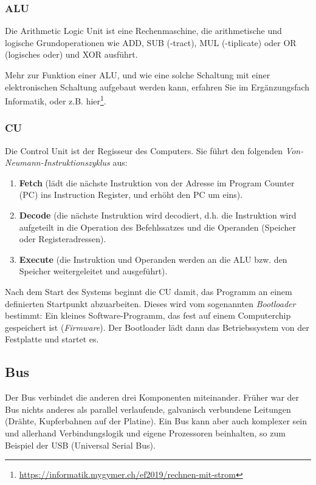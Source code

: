 \subsubsection{ALU}

Die Arithmetic Logic Unit ist eine Rechenmaschine, die arithmetische und logische Grundoperationen wie ADD, SUB (-tract), MUL (-tiplicate) oder OR (logisches oder) und XOR ausführt.

Mehr zur Funktion einer ALU, und wie eine solche Schaltung mit einer elektronischen Schaltung aufgebaut werden kann, erfahren Sie im Ergänzungsfach Informatik, oder z.B. hier\footnote{\url{https://informatik.mygymer.ch/ef2019/rechnen-mit-strom}}.

\subsubsection{CU}

Die Control Unit ist der Regisseur des Computers. Sie führt den folgenden \emph{Von-Neumann-Instruktionszyklus} aus:


\begin{enumerate}
	\item \textbf{Fetch} (lädt die nächste Instruktion von der Adresse im Program Counter (PC) ins Instruction Register, und erhöht den PC um eins).
	\item \textbf{Decode} (die nächste Instruktion wird decodiert, d.h. die Instruktion wird aufgeteilt in die Operation des Befehlssatzes und die Operanden (Speicher oder Registeradressen).
	\item \textbf{Execute} (die Instruktion und Operanden werden an die ALU bzw. den Speicher weitergeleitet und ausgeführt).
\end{enumerate}

Nach dem Start des Systems beginnt die CU damit, das Programm an einem definierten Startpunkt abzuarbeiten. Dieses wird vom sogenannten \emph{Bootloader} bestimmt: Ein kleines Software-Programm, das fest auf einem Computerchip gespeichert ist (\emph{Firmware}). Der Bootloader lädt dann
das Betriebssystem von der Festplatte und startet es.

\subsection{Bus}

Der Bus verbindet die anderen drei Komponenten miteinander. Früher war der Bus nichts anderes als parallel verlaufende, galvanisch verbundene Leitungen (Drähte, Kupferbahnen auf der Platine). Ein Bus kann aber auch komplexer sein und allerhand Verbindungslogik und eigene Prozessoren beinhalten, so zum Beispiel der USB (Universal Serial Bus). 


